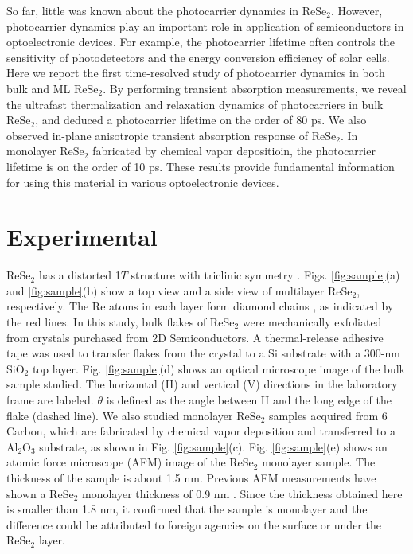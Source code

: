 \documentclass{osa-article}
\begin{document}
So far, little was known about the photocarrier dynamics in ReSe$_2$. However, photocarrier dynamics play an important role in application of semiconductors in optoelectronic devices. For example, the photocarrier lifetime often controls the sensitivity of photodetectors and the energy conversion efficiency of solar cells. Here we report the first time-resolved study of photocarrier dynamics in both bulk and ML ReSe$_2$. By performing transient absorption measurements, we reveal the ultrafast thermalization and relaxation dynamics of photocarriers in bulk ReSe$_2$, and deduced a photocarrier lifetime on the order of 80 ps. We also observed in-plane anisotropic transient absorption response of ReSe$_2$. In monolayer ReSe$_2$ fabricated by chemical vapor depositioin, the photocarrier lifetime is on the order of 10 ps. These results provide fundamental information for using this material in various optoelectronic devices.


\section{Experimental}

ReSe$_2$ has a distorted 1$T$ structure with triclinic symmetry \cite{jpcm94411}. Figs. \ref{fig:sample}(a) and \ref{fig:sample}(b) show a top view and a side view of multilayer ReSe$_2$, respectively. The Re atoms in each layer form diamond chains \cite{jpcm94411}, as indicated by the red lines. In this study, bulk flakes of ReSe$_2$ were mechanically exfoliated from crystals purchased from 2D Semiconductors. A thermal-release adhesive tape was used to transfer flakes from the crystal to a Si substrate with a 300-nm SiO$_2$ top layer. Fig. \ref{fig:sample}(d) shows an optical microscope image of the bulk sample studied. The horizontal (H) and vertical (V) directions in the laboratory frame are labeled. $\theta$ is defined as the angle between H and the long edge of the flake (dashed line). We also studied monolayer ReSe$_2$ samples acquired from 6 Carbon, which are fabricated by chemical vapor deposition and transferred to a Al$_2$O$_3$ substrate, as shown in Fig. \ref{fig:sample}(c). Fig. \ref{fig:sample}(e) shows an atomic force microscope (AFM) image of the ReSe$_2$ monolayer sample. The thickness of the sample is about 1.5 nm. Previous AFM measurements have shown a ReSe$_2$ monolayer thickness of 0.9 nm \cite{s42004}. Since the thickness obtained here is smaller than 1.8 nm, it confirmed that the sample is monolayer and the difference could be attributed to foreign agencies on the surface or under the ReSe$_2$ layer.
\end{document}
